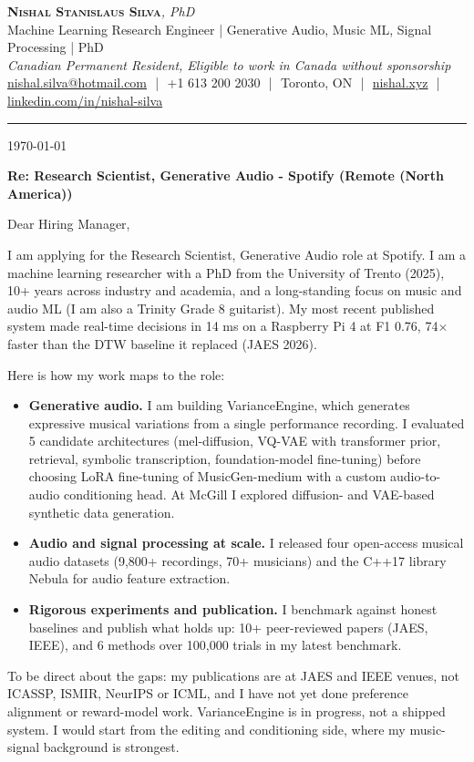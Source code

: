 \documentclass[11pt]{article}
\makeatletter
\newcommand{\clName}{Nishal Stanislaus Silva}
\newcommand{\clEmail}{nishal.silva@hotmail.com}
\newcommand{\clPhone}{+1 613 200 2030}
\newcommand{\clCity}{Toronto, ON}
\newcommand{\clSite}{https://nishal.xyz}
\newcommand{\clLinkedIn}{https://www.linkedin.com/in/nishal-silva}
\newcommand{\clStatus}{Canadian Permanent Resident, Eligible to work in Canada without sponsorship}
\newcommand{\clTagline}{Machine Learning Research Engineer | Generative Audio, Music ML, Signal Processing | PhD}
\newcommand{\clRole}{Research Scientist, Generative Audio}
\newcommand{\clCompany}{Spotify}
\newcommand{\clAddressee}{Dear Hiring Manager,}
\makeatother
\begin{document}
\pagestyle{empty}

\begin{center}
    {\LARGE \scshape \textbf{\clName}}{\large \textit{, PhD}}
    \\[1pt]
    {\small \clTagline}
    \\[1pt]
    {\footnotesize\textit{\clStatus}}
    \\[1pt]
    {\small
    \href{mailto:\clEmail}{\clEmail}
    \,\,|\,\, \clPhone
    \,\,|\,\, \clCity
    \,\,|\,\, \href{\clSite}{nishal.xyz}
    \,\,|\,\, \href{\clLinkedIn}{linkedin.com/in/nishal-silva}}
\end{center}

\rule{\linewidth}{0.4pt}\vspace{0.6em}

\today

\textbf{Re: \clRole{} - \clCompany{} (Remote (North America))}

\clAddressee

I am applying for the \clRole{} role at \clCompany{}. I am a machine learning researcher with a PhD from the University of Trento (2025), 10+ years across industry and academia, and a long-standing focus on music and audio ML (I am also a Trinity Grade 8 guitarist). My most recent published system made real-time decisions in 14 ms on a Raspberry Pi 4 at F1 0.76, 74$\times$ faster than the DTW baseline it replaced (JAES 2026).

Here is how my work maps to the role:
\begin{itemize}[leftmargin=1.4em, itemsep=0.1em, topsep=0.2em]
    \item \textbf{Generative audio.} I am building VarianceEngine, which generates expressive musical variations from a single performance recording. I evaluated 5 candidate architectures (mel-diffusion, VQ-VAE with transformer prior, retrieval, symbolic transcription, foundation-model fine-tuning) before choosing LoRA fine-tuning of MusicGen-medium with a custom audio-to-audio conditioning head. At McGill I explored diffusion- and VAE-based synthetic data generation.
    \item \textbf{Audio and signal processing at scale.} I released four open-access musical audio datasets (9,800+ recordings, 70+ musicians) and the C++17 library Nebula for audio feature extraction.
    \item \textbf{Rigorous experiments and publication.} I benchmark against honest baselines and publish what holds up: 10+ peer-reviewed papers (JAES, IEEE), and 6 methods over 100,000 trials in my latest benchmark.
\end{itemize}
To be direct about the gaps: my publications are at JAES and IEEE venues, not ICASSP, ISMIR, NeurIPS or ICML, and I have not yet done preference alignment or reward-model work. VarianceEngine is in progress, not a shipped system. I would start from the editing and conditioning side, where my music-signal background is strongest.
\end{document}
